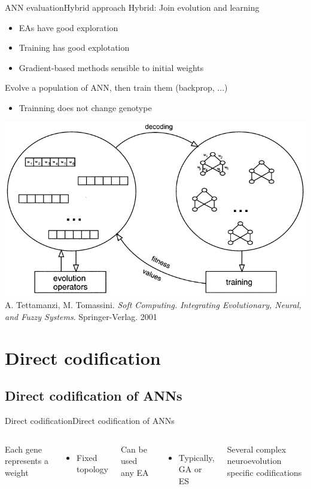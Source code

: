 \documentclass[10pt,compress]{beamer} %
\begin{document}
\begin{frame}{ANN evaluation}{Hybrid approach}
	Hybrid: Join evolution and learning
	\begin{itemize}
		\item EAs have good exploration
		\item Training has good explotation
		\item Gradient-based methods sensible to initial weights
	\end{itemize}
	Evolve a population of ANN, then train them (backprop, ...)
	\begin{itemize}
		\item Trainning does not change genotype
    \end{itemize}

	\begin{center}
	\includegraphics[width=0.4\linewidth]{figs/hybrid.png}\\
    \tiny{A. Tettamanzi, M. Tomassini. \textit{Soft Computing. Integrating Evolutionary, Neural, and Fuzzy Systems}. Springer-Verlag. 2001}
	\end{center}
\end{frame}



\section{Direct codification}
\subsection{Direct codification of ANNs}

\begin{frame}{Direct codification}{Direct codification of ANNs}
    \begin{columns}
        Each gene represents a weight
	        \begin{itemize}
                \item Fixed topology
	        \end{itemize}
        Can be used any EA
	        \begin{itemize}
                \item Typically, GA or ES
	        \end{itemize}
        Several complex neuroevolution specific codifications
            
    \end{columns}
\end{frame}
\end{document}
